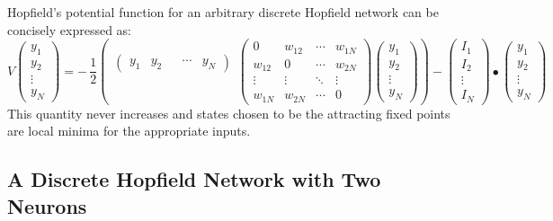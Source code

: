   Hopfield's potential function for an arbitrary discrete Hopfield network 
can be concisely expressed as:
\begin{equation}
V
\begin{pmatrix}
y_1 \\  y_2 \\ \vdots \\ y_N
\end{pmatrix}
  =  -\,\displaystyle{\frac{1}{2}} \left(
     \begin{matrix}
       \begin{pmatrix}
           y_1 & y_2 & & \cdots & y_N 
       \end{pmatrix} \\ \\ \\ \mbox{}\end{matrix}
       \begin{pmatrix} 
           0      & w_{12} & \cdots & w_{1N} \\ 
           w_{12} &   0    & \cdots & w_{2N} \\ 
           \vdots & \vdots & \ddots & \vdots \\ 
           w_{1N} & w_{2N} & \cdots &   0  
       \end{pmatrix} 
       \begin{pmatrix} 
            y_1 \\ y_2 \\ \vdots \\ y_N 
       \end{pmatrix} 
     \right) -
\begin{pmatrix}
I_1 \\  I_2 \\ \vdots \\ I_N
\end{pmatrix}
\bullet
\begin{pmatrix}
y_1 \\  y_2 \\ \vdots \\ y_N
\end{pmatrix}
\end{equation}
This quantity never increases and states chosen to be the attracting fixed 
points are local minima for the appropriate inputs.
  
\subsection{A Discrete Hopfield Network with Two Neurons}

